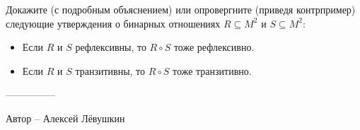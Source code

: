 \question
Докажите (с подробным объяснением) или опровергните (приведя контрпример) следующие утверждения о бинарных отношениях $R \subseteq M^2$ и $S \subseteq M^2$:
\begin{itemize}
    \item Если $R$ и $S$ рефлексивны, то $R \circ S$ тоже рефлексивно.
    \item Если $R$ и $S$ транзитивны, то $R \circ S$ тоже транзитивно.
\end{itemize}

---------------

Автор -- Алексей Лёвушкин